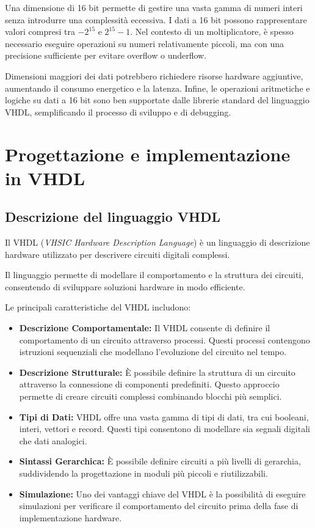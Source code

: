 \documentclass[titlepage]{report}
\begin{document}
			Una dimensione di 16 bit permette di gestire una vasta gamma di numeri interi senza introdurre una complessità eccessiva. I dati a 16 bit possono rappresentare valori compresi tra $-2^{15}$ e $2^{15}-1$. Nel contesto di un moltiplicatore, è spesso necessario eseguire operazioni su numeri relativamente piccoli, ma con una precisione sufficiente per evitare overflow o underflow.

			Dimensioni maggiori dei dati potrebbero richiedere risorse hardware aggiuntive, aumentando il consumo energetico e la latenza.
			Infine, le operazioni aritmetiche e logiche su dati a 16 bit sono ben supportate dalle librerie standard del linguaggio VHDL, semplificando il processo di sviluppo e di debugging.


\chapter*{Progettazione e implementazione in VHDL}
\label{ch:progettazione_vhdl}
	\section*{Descrizione del linguaggio VHDL}
	\label{sec:desc_vhdl}
		Il VHDL (\textit{VHSIC Hardware Description Language}) è un linguaggio di descrizione hardware utilizzato per descrivere circuiti digitali complessi.

		Il linguaggio permette di modellare il comportamento e la struttura dei circuiti, consentendo di sviluppare soluzioni hardware in modo efficiente.

		Le principali caratteristiche del VHDL includono:
		\begin{itemize}
			\item \textbf{Descrizione Comportamentale:} Il VHDL consente di definire il comportamento di un circuito attraverso processi. Questi processi contengono istruzioni sequenziali che modellano l'evoluzione del circuito nel tempo.
			
			\item \textbf{Descrizione Strutturale:} È possibile definire la struttura di un circuito attraverso la connessione di componenti predefiniti. Questo approccio permette di creare circuiti complessi combinando blocchi più semplici.
			
			\item \textbf{Tipi di Dati:} VHDL offre una vasta gamma di tipi di dati, tra cui booleani, interi, vettori e record. Questi tipi consentono di modellare sia segnali digitali che dati analogici.
			
			\item \textbf{Sintassi Gerarchica:} È possibile definire circuiti a più livelli di gerarchia, suddividendo la progettazione in moduli più piccoli e riutilizzabili.
			
			\item \textbf{Simulazione:} Uno dei vantaggi chiave del VHDL è la possibilità di eseguire simulazioni per verificare il comportamento del circuito prima della fase di implementazione hardware.
		\end{itemize}
\end{document}
